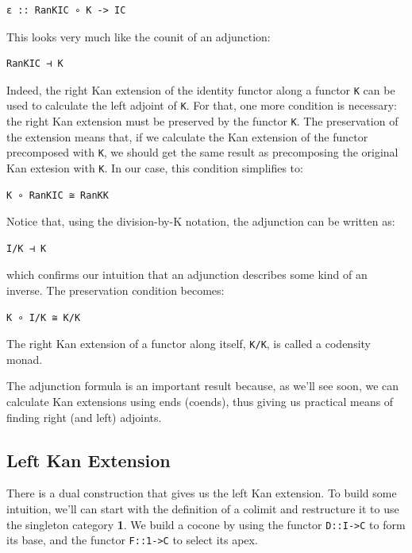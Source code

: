 \begin{verbatim}
ε :: RanKIC ∘ K -> IC
\end{verbatim}

This looks very much like the counit of an adjunction:

\begin{verbatim}
RanKIC ⊣ K
\end{verbatim}

Indeed, the right Kan extension of the identity functor along a functor
\texttt{K} can be used to calculate the left adjoint of \texttt{K}. For
that, one more condition is necessary: the right Kan extension must be
preserved by the functor \texttt{K}. The preservation of the extension
means that, if we calculate the Kan extension of the functor precomposed
with \texttt{K}, we should get the same result as precomposing the
original Kan extesion with \texttt{K}. In our case, this condition
simplifies to:

\begin{verbatim}
K ∘ RanKIC ≅ RanKK
\end{verbatim}

Notice that, using the division-by-K notation, the adjunction can be
written as:

\begin{verbatim}
I/K ⊣ K
\end{verbatim}

which confirms our intuition that an adjunction describes some kind of
an inverse. The preservation condition becomes:

\begin{verbatim}
K ∘ I/K ≅ K/K
\end{verbatim}

The right Kan extension of a functor along itself, \texttt{K/K}, is
called a codensity monad.

The adjunction formula is an important result because, as we'll see
soon, we can calculate Kan extensions using ends (coends), thus giving
us practical means of finding right (and left) adjoints.

\subsection{Left Kan Extension}\label{left-kan-extension}

There is a dual construction that gives us the left Kan extension. To
build some intuition, we'll can start with the definition of a colimit
and restructure it to use the singleton category \textbf{1}. We build a
cocone by using the functor \texttt{D::I-\textgreater{}C} to form its
base, and the functor \texttt{F::1-\textgreater{}C} to select its apex.

